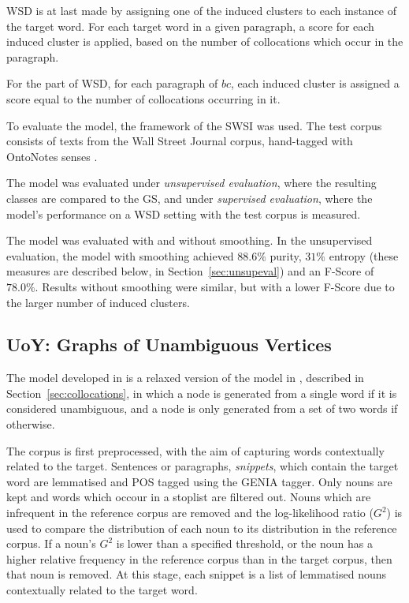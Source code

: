 \ac{WSD} is at last made by assigning one of the induced clusters to each
instance of the target word. For each target word in a given paragraph, a score
for each induced cluster is applied, based on the number of collocations which
occur in the paragraph.

For the part of \ac{WSD}, for each paragraph of $bc$, each induced cluster is
assigned a score equal to the number of collocations occurring in it.

To evaluate the model, the framework of the \ac{SWSI} \cite{agirre2007semeval}
was used. The test corpus consists of texts from the Wall Street Journal
corpus, hand-tagged with OntoNotes senses \cite{hovy2006ontonotes}.

The model was evaluated under \textit{unsupervised evaluation}, where the
resulting classes are compared to the \ac{GS}, and under \textit{supervised
evaluation}, where the model's performance on a \ac{WSD} setting with the
test corpus is measured.

The model was evaluated with and without smoothing. In the unsupervised
evaluation, the model with smoothing achieved $88.6\%$ purity, $31\%$ entropy
(these measures are described below, in Section~\ref{sec:unsupeval}) and an
F-Score of $78.0\%$. Results without smoothing were similar, but with a lower
F-Score due to the larger number of induced clusters.

\subsection{UoY: Graphs of Unambiguous Vertices}

The model developed in \cite{korkontzelos2010uoy} is a relaxed version of the
model in \cite{klapaftis2008word}, described in Section~\ref{sec:collocations},
in which a node is generated from a single word if it is considered unambiguous,
and a node is only generated from a set of two words if otherwise.

The corpus is first preprocessed, with the aim of capturing words contextually
related to the target. Sentences or paragraphs, \textit{snippets}, which contain
the target word are lemmatised and \ac{POS} tagged using the GENIA tagger. Only
nouns are kept and words which occour in a stoplist are filtered out. Nouns
which are infrequent in the reference corpus are removed and the log-likelihood
ratio ($G^2$) is used to compare the distribution of each noun to its
distribution in the reference corpus. If a noun's $G^2$ is lower than a
specified threshold, or the noun has a higher relative frequency in the
reference corpus than in the target corpus, then that noun is removed. At this
stage, each snippet is a list of lemmatised nouns contextually related to the
target word.

